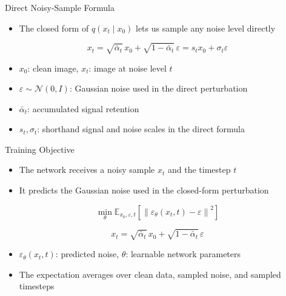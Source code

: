 \documentclass[10pt,aspectratio=169]{ntuabeamer}
\begin{document}
\begin{frame}{Direct Noisy-Sample Formula}
  \begin{itemize}
    \item The closed form of \(q(x_t \mid x_0)\) lets us sample any noise level directly
  \end{itemize}

  \[
    x_t
    =
    \sqrt{\bar{\alpha}_t}\,x_0
    +
    \sqrt{1-\bar{\alpha}_t}\,\varepsilon
    =
    s_t x_0 + \sigma_t \varepsilon
  \]

  \begin{itemize}
    \item \(x_0\): clean image, \(x_t\): image at noise level \(t\)
    \item \(\varepsilon \sim \mathcal N(0,I)\): Gaussian noise used in the direct perturbation
    \item \(\bar{\alpha}_t\): accumulated signal retention
    \item \(s_t,\sigma_t\): shorthand signal and noise scales in the direct formula
  \end{itemize}
\end{frame}

\begin{frame}{Training Objective}
  \begin{itemize}
    \item The network receives a noisy sample \(x_t\) and the timestep \(t\)
    \item It predicts the Gaussian noise used in the closed-form perturbation
  \end{itemize}

  \[
    \min_\theta
    \mathbb E_{x_0,\varepsilon,t}
    \left[
      \left\|
        \varepsilon_\theta(x_t,t) - \varepsilon
      \right\|^2
    \right]
  \]

  \[
    x_t
    =
    \sqrt{\bar{\alpha}_t}\,x_0
    +
    \sqrt{1-\bar{\alpha}_t}\,\varepsilon
  \]

  \begin{itemize}
    \item \(\varepsilon_\theta(x_t,t)\): predicted noise, \(\theta\): learnable network parameters
    \item The expectation averages over clean data, sampled noise, and sampled timesteps
  \end{itemize}
\end{frame}
\end{document}
